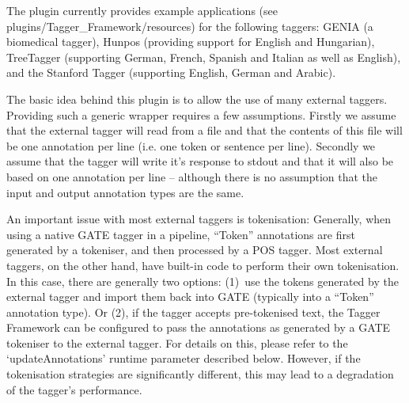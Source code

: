 The plugin currently provides example applications (see plugins/Tagger\_Framework/resources) for the following
taggers: GENIA (a biomedical tagger), Hunpos (providing support for English and Hungarian), TreeTagger
(supporting German, French, Spanish and Italian as well as English), and the Stanford Tagger
(supporting English, German and Arabic).

The basic idea behind this plugin is to allow the use of many external taggers. Providing such a generic
wrapper requires a few assumptions. Firstly we assume that the external tagger will read from a file and
that the contents of this file will be one annotation per line (i.e. one token or sentence per line). Secondly
we assume that the tagger will write it's response to stdout and that it will also be based on one
annotation per line -- although there is no assumption that the input and output annotation types are the same.

An important issue with most external taggers is tokenisation:
Generally, when using a native GATE tagger in a pipeline, ``Token''
annotations are first generated by a tokeniser, and then processed by
a POS tagger. Most external taggers, on the other hand, have built-in
code to perform their own tokenisation. In this case, there are
generally two options: (1)~use the tokens generated by the external
tagger and import them back into GATE (typically into a ``Token''
annotation type). Or (2), if the tagger accepts pre-tokenised text,
the Tagger Framework can be configured to pass the annotations as
generated by a GATE tokeniser to the external tagger. For details on
this, please refer to the `updateAnnotations' runtime parameter
described below. However, if the tokenisation strategies are
significantly different, this may lead to a degradation of the
tagger's performance.

